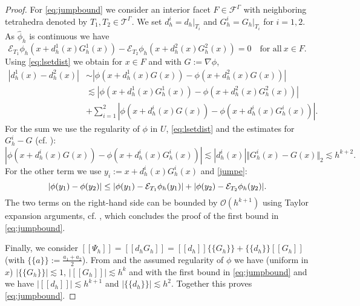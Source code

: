 \documentclass[final]{siamltex}
\begin{document}
\begin{proof}
For \eqref{eq:jumpbound} we consider an interior facet $F \in {{\mathcal{F}}^{\Gamma}}$ with neighboring tetrahedra denoted by $T_1,T_2\in {{\mathcal{T}}^{\Gamma}}$. 
We set $d_h^i = d_h|_{T_i}$ and $G_h^i = G_h|_{T_i}$ for $i=1,2$. As ${\hat \phi_h}$ is continuous we have
\begin{equation}\label{jumpe}
\mathcal{E}_{T_1} \phi_h(x+d_h^1(x) G_h^1(x)) - \mathcal{E}_{T_2} \phi_h(x+d_h^2(x) G_h^2(x)) = 0 \quad \text{for all}~ x \in F.
\end{equation}
Using \eqref{eq:lsetdist} we obtain for $x \in F$ and with $G:=\nabla \phi$,
\begin{align*}
  |d_h^1(x) - d_h^2(x)| & \sim | \phi(x+d_h^1(x)G(x)) - \phi(x+d_h^2(x)G(x)) | \\
   & \lesssim | \phi(x+d_h^1(x)G_h^1(x)) - \phi(x+d_h^2(x)G_h^2(x)) | \\
 & + \sum_{i=1}^2| \phi(x+d_h^i(x)G(x)) - \phi(x+d_h^i(x)G_h^i(x)) |. 
\end{align*}
For the sum we use the regularity of $\phi$ in $U$, \eqref{eq:lsetdist} and the estimates for $G_h^i - G$ (cf. \cite[Lemma 3.1]{CLARH1}): 
\[
| \phi(x+d_h^i(x)G(x)) - \phi(x+d_h^i(x)G_h^i(x)) | \lesssim |d_h^i(x)| \Vert G_h^i(x) - G(x) \Vert_2 \lesssim h^{k+2}.
\]
For the other term we use $y_i:=x+d_h^i(x)G_h^i(x)$ and \eqref{jumpe}:
\[
 |\phi(y_1)-\phi(y_2)| \leq |\phi(y_1)-\mathcal{E}_{T_1} \phi_h(y_1)| + |\phi(y_2)-\mathcal{E}_{T_2} \phi_h(y_2)|. \vspace*{-0.1cm}
\]
The two terms on the right-hand side can be bounded by $\mathcal{O}(h^{k+1})$ using Taylor expansion arguments, cf. \cite[Proof of Lemma 3.2]{CLARH1}, which concludes the proof of the first bound in \eqref{eq:jumpbound}. 

Finally, we consider ${[\![{\Psi_h}]\!]} = {[\![{d_h G_h}]\!]} = {[\![{d_h}]\!]} {{\{\!\!\{} {G_h} {\}\!\!\}}} + {{\{\!\!\{} {d_h} {\}\!\!\}}} {[\![{G_h}]\!]}$ (with ${{\{\!\!\{} {a} {\}\!\!\}}} := \frac{a_1+a_2}{2}$).
From \cite[Lemma 3.1]{CLARH1} and the assumed regularity of $\phi$ we have (uniform in $x$) $|{{\{\!\!\{} {G_h} {\}\!\!\}}}| \lesssim 1$, $|{[\![{G_h}]\!]}| \lesssim h^k$ and with the first bound in \eqref{eq:jumpbound} and \cite[Lemma 3.2]{CLARH1} we have $|{[\![{d_h}]\!]}| \lesssim h^{k+1}$ and $|{{\{\!\!\{} {d_h} {\}\!\!\}}}| \lesssim h^2$. Together this proves \eqref{eq:jumpbound}.
\end{proof}



\end{document}
